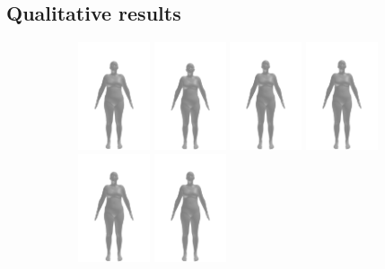 \subsection{Qualitative results}
\begin{figure}[h]
    \centering
    \begin{subfigure}{\textwidth}
        \centering
        \includegraphics[width=60pt]{files/patients/9_2}
        \includegraphics[width=60pt]{files/patients/9_3}
        \includegraphics[width=60pt]{files/patients/9_4}
        \includegraphics[width=60pt]{files/patients/9_5}
        \includegraphics[width=60pt]{files/patients/9_6}
        \hspace{10pt}
        \includegraphics[width=60pt]{files/patients/9_predicted}

\end{subfigure}
\end{figure}

